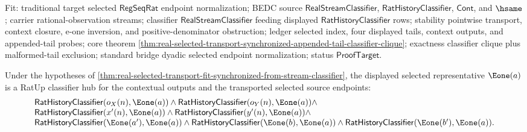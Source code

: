 Fit: traditional target selected $\mathsf{RegSeqRat}$ endpoint normalization;
BEDC source $\mathsf{RealStreamClassifier}$,
$\mathsf{RatHistoryClassifier}$, $\mathsf{Cont}$, and $\hsame$; carrier
rational-observation streams; classifier $\mathsf{RealStreamClassifier}$
feeding displayed $\mathsf{RatHistoryClassifier}$ rows; stability pointwise
transport, context closure, e-one inversion, and positive-denominator
obstruction; ledger selected index, four displayed tails, context outputs, and
appended-tail probes; core theorem
\autoref{thm:real-selected-transport-synchronized-appended-tail-classifier-clique};
exactness classifier clique plus malformed-tail exclusion; standard bridge
dyadic selected endpoint normalization; status $\mathsf{ProofTarget}$.

\begin{theorem}
\label{thm:real-selected-transport-common-rational-classifier-class}
Under the hypotheses of
\autoref{thm:real-selected-transport-fit-synchronized-from-stream-classifier},
the displayed selected representative $\Eone(a)$ is a RatUp classifier hub for
the contextual outputs and the transported selected source endpoints:
$$
\begin{array}{l}
\mathsf{RatHistoryClassifier}(o_X(n),\Eone(a))\land
\mathsf{RatHistoryClassifier}(o_Y(n),\Eone(a))\land\\
\mathsf{RatHistoryClassifier}(x'(n),\Eone(a))\land
\mathsf{RatHistoryClassifier}(y'(n),\Eone(a))\land\\
\mathsf{RatHistoryClassifier}(\Eone(a'),\Eone(a))\land
\mathsf{RatHistoryClassifier}(\Eone(b),\Eone(a))\land
\mathsf{RatHistoryClassifier}(\Eone(b'),\Eone(a)).
\end{array}
$$
\end{theorem}
